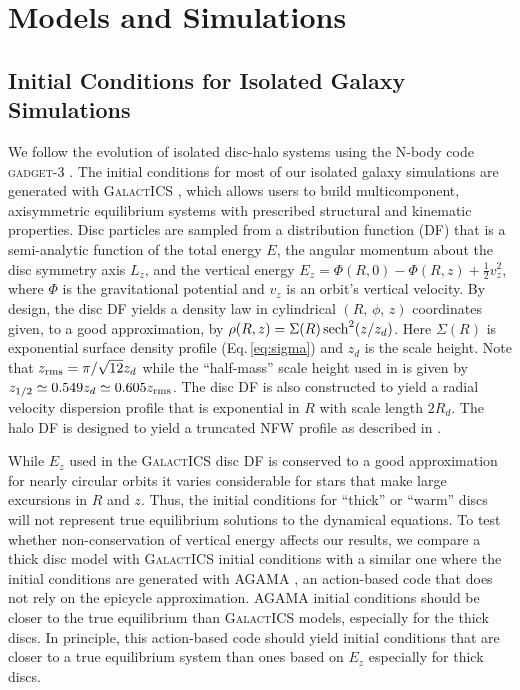 \section{Models and Simulations} \label{sec:thick_discs_suppress}

\subsection{Initial Conditions for Isolated Galaxy Simulations} \label{sssec:isolated}

We follow the evolution of isolated disc-halo systems using the N-body
code \textsc{gadget-3} \citep{GadgetCodePaper}.  The initial
conditions for most of our isolated galaxy simulations are generated
with \textsc{GalactICS} \citep{GalactICS1995,WPDGalactICSReference},
which allows users to build multicomponent, axisymmetric equilibrium
systems with prescribed structural and kinematic properties.  Disc
particles are sampled from a distribution function (DF) that is a
semi-analytic function of the total energy $E$, the angular momentum
about the disc symmetry axis $L_z$, and the vertical energy {$E_z = \Phi(R,0) - \Phi(R,z) + \frac{1}{2} v_z^2$, where $\Phi$ is the gravitational potential and $v_z$ is an orbit's vertical velocity. } By
design, the disc DF yields a density law in cylindrical $\left
(R,\,\phi,\,z\right )$ coordinates given, to a good approximation, by
$\rho(R,z) = \Sigma(R)\,{\rm sech}^2(z/z_d)$.  Here $\Sigma(R)$ is
exponential surface density profile (Eq.\,\ref{eq:sigma}) and $z_d$ is
the scale height. Note that $z_{\rm rms} = \pi/\sqrt{12} z_d$ while the
``half-mass'' scale height used in \citet{YurinSpringelStellarDisks}
is given by $z_{1/2} \simeq 0.549z_d \simeq 0.605 z_{\rm rms}$.  The disc DF
is also constructed to yield a radial velocity dispersion profile that
is exponential in $R$ with scale length $2R_d$. The halo DF is
designed to yield a truncated NFW profile \citep{NFW} as described in
\citet{WPDGalactICSReference}.

While $E_z$ used in the \textsc{GalactICS} disc DF
is conserved to a good approximation for nearly circular orbits it
varies considerable for stars that make large excursions in $R$ and
$z$.  Thus, the initial conditions for ``thick'' or ``warm'' discs
will not represent true equilibrium solutions to the dynamical
equations.  To test whether non-conservation of vertical energy
affects our results, we compare a thick disc model with
\textsc{GalactICS} initial conditions with a similar one where the
initial conditions are generated with \textsc{AGAMA} \citep{agama}, 
{an action-based code that does not rely on the epicycle 
approximation.  \textsc{AGAMA} initial conditions should be closer 
to the true equilibrium than \textsc{GalactICS} models, especially for the thick discs.}
In principle, this action-based code should yield initial conditions
that are closer to a true equilibrium system than ones based on $E_z$
especially for thick discs.

